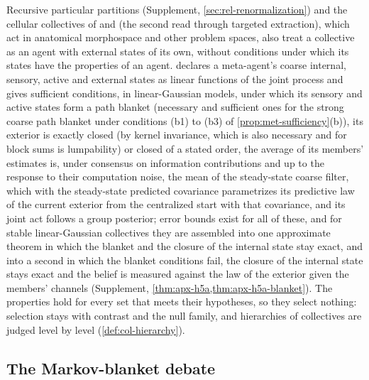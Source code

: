 Recursive particular partitions (Supplement, \cref{sec:rel-renormalization}) and the cellular collectives of \citet{fields2022competency} and \citet{levin2022technological} (the second read through targeted extraction), which act in anatomical morphospace and other problem spaces, also treat a collective as an agent with external states of its own, without conditions under which its states have the properties of an agent.  declares a meta-agent's coarse internal, sensory, active and external states as linear functions of the joint process and gives sufficient conditions, in linear-Gaussian models, under which its sensory and active states form a path blanket (necessary and sufficient ones for the strong coarse path blanket under conditions (b1) to (b3) of \cref{prop:met-sufficiency}(b)), its exterior is exactly closed (by kernel invariance, which is also necessary and for block sums is lumpability) or closed of a stated order, the average of its members' estimates is, under consensus on information contributions and up to the response to their computation noise, the mean of the steady-state coarse filter, which with the steady-state predicted covariance parametrizes its predictive law of the current exterior from the centralized start with that covariance, and its joint act follows a group posterior; error bounds exist for all of these, and for stable linear-Gaussian collectives they are assembled into one approximate theorem in which the blanket and the closure of the internal state stay exact, and into a second in which the blanket conditions fail, the closure of the internal state stays exact and the belief is measured against the law of the exterior given the members' channels (Supplement, \cref{thm:apx-h5a,thm:apx-h5a-blanket}). The properties hold for every set that meets their hypotheses, so they select nothing: selection stays with contrast and the null family, and hierarchies of collectives are judged level by level (\cref{def:col-hierarchy}).

\subsection{The Markov-blanket debate}\label{sec:rel-debate}

